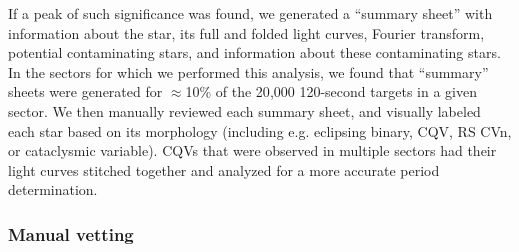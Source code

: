 \documentclass[11pt,twocolumn,tighten]{aastex63}
\begin{document}
If a peak of such significance was found, we generated a ``summary
sheet'' with information about the star, its full and folded light
curves, Fourier transform, potential contaminating stars, and
information about these contaminating stars.  In the sectors for which
we performed this analysis, we found that ``summary'' sheets were
generated for $\approx$10\% of the 20{,}000 120-second targets in a
given sector.  We then manually reviewed each summary sheet, and
visually labeled each star based on its morphology (including e.g.
eclipsing binary, CQV, RS CVn, or cataclysmic variable).  CQVs that
were observed in multiple sectors had their light curves stitched
together and analyzed for a more accurate period determination.


\subsubsection{Manual vetting}
\end{document}
